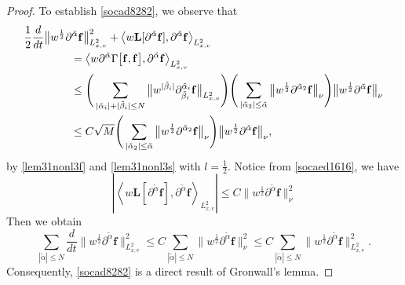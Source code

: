 \documentclass[reqno]{amsart}
\numberwithin{equation}{section}
\numberwithin{equation}{section}
\begin{document}
\begin{proof}
			To establish \eqref{socad8282}, we observe that
			\begin{align}
				&\frac{1}{2}\frac{d}{dt}\big\|w^{\frac{1}{2}} \partial^{\tilde{\alpha}} \mathbf{f}\big\|_{L^{2}_{x,v}}^2 + \big\langle w\mathbf{L}[\partial^{\tilde{\alpha}} \mathbf{f}], \partial^{\tilde{\alpha}} \mathbf{f} \big\rangle_{L^{2}_{x,v}}\notag \\
				&\hspace{1.5cm}= \big\langle w\partial^{\tilde{\alpha}} \Gamma\big[\mathbf{f}, \mathbf{f}\big], \partial^{\tilde{\alpha}} \mathbf{f} \big\rangle_{L^{2}_{x,v}} \notag\\
				&\hspace{1.5cm}\le \Bigg( \sum_{| \tilde{\alpha}_i |+| \tilde{\beta}_i | \leq N} \big\| w^{| \tilde{\beta}_i |} \partial_{\tilde{\beta}_i}^{\tilde{\alpha}_i} \mathbf{f}\big\|_{L^{2}_{x,v}} \Bigg)\Bigg( \sum_{|\tilde{\alpha}_2| \le \tilde{\alpha}} \big\|w^{\frac{1}{2}}\partial^{\tilde{\alpha}_2} \mathbf{f}\big\|_{\nu} \Bigg)\big\|w^{\frac{1}{2}}\partial^{\tilde{\alpha}} \mathbf{f}\big\|_{\nu} \notag\\
				&\hspace{1.5cm}\le C\sqrt{M}\Bigg( \sum_{|\tilde{\alpha}_2| \leq \tilde{\alpha}} \big\|w^{\frac{1}{2}}\partial^{\tilde{\alpha}_2} \mathbf{f}\big\|_{\nu} \Bigg)\big\|w^{\frac{1}{2}}\partial^{\tilde{\alpha}} \mathbf{f}\big\|_{\nu}, \label{socad8686}
			\end{align}
			by \eqref{lem31nonl3f} and \eqref{lem31nonl3s} with $l = \frac{1}{2}$.  Notice from \eqref{socaed1616}, we have
			\begin{equation*}
				\left| \left\langle w\mathbf{L}[\partial^{\tilde{\alpha}} \mathbf{f}], \partial^{\tilde{\alpha}} \mathbf{f} \right\rangle_{L^{2}_{x,v}} \right| \leq C \big\|w^{\frac{1}{2}}\partial^{\tilde{\alpha}} \mathbf{f}\big\|^2_{\nu} 
			\end{equation*}
			Then we obtain
			\begin{equation*}
				\sum_{|\tilde{\alpha}| \le N}\frac{d}{dt} \big\|w^{\frac{1}{2}} \partial^{\tilde{\alpha}} \mathbf{f}\big\|_{L^{2}_{x,v}}^2 \le C \sum_{|\tilde{\alpha}| \le N} \big\|w^{\frac{1}{2}} \partial^{\tilde{\alpha}} \mathbf{f}\big\|_{\nu}^2 \leq C \sum_{|\tilde{\alpha}| \leq N} \big\|w^{\frac{1}{2}} \partial^{\tilde{\alpha}} \mathbf{f}\big\|_{L^{2}_{x,v}}^2.
			\end{equation*}
			Consequently, \eqref{socad8282} is a direct result of Gronwall's lemma.
			

\end{proof}
\end{document}
